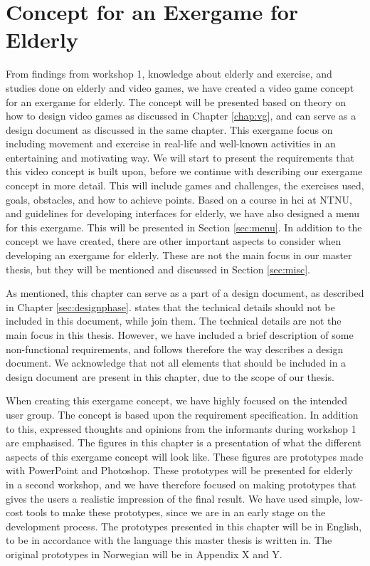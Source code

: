 \chapter{Concept for an Exergame for Elderly}
\label{chap:concept}
From findings from workshop 1, knowledge about elderly and exercise, and studies done on elderly and video games, we have created a video game concept for an exergame for elderly. The concept will be presented based on theory on how to design video games as discussed in Chapter \ref{chap:vg}, and can serve as a design document as discussed in the same chapter. This exergame focus on including movement and exercise in real-life and well-known activities in an entertaining and motivating way. We will start to present the requirements that this video concept is built upon, before we continue with describing our exergame concept in more detail. This will include games and challenges, the exercises used, goals, obstacles, and how to achieve points. Based on a course in \ac{hci} at NTNU, and guidelines for developing interfaces for elderly, we have also designed a menu for this exergame. This will be presented in Section \ref{sec:menu}. In addition to the concept we have created, there are other important aspects to consider when developing an exergame for elderly. These are not the main focus in our master thesis, but they will be mentioned and discussed in Section \ref{sec:misc}.

As mentioned, this chapter can serve as a part of a design document, as described in Chapter \ref{sec:designphase}. \cite{gamedesign} states that the technical details should not be included in this document, while \cite{understandingvg} join them. The technical details are not the main focus in this thesis. However, we have included a brief description of some non-functional requirements, and follows therefore the way \cite{understandingvg} describes a design document. We acknowledge that not all elements that should be included in a design document are present in this chapter, due to the scope of our thesis.

When creating this exergame concept, we have highly focused on the intended user group. The concept is based upon the requirement specification. In addition to this, expressed thoughts and opinions from the informants during workshop 1 are emphasised. The figures in this chapter is a presentation of what the different aspects of this exergame concept will look like. These figures are prototypes made with PowerPoint and Photoshop. These prototypes will be presented for elderly in a second workshop, and we have therefore focused on making prototypes that gives the users a realistic impression of the final result. We have used simple, low-cost tools to make these prototypes, since we are in an early stage on the development process. The prototypes presented in this chapter will be in English, to be in accordance with the language this master thesis is written in. The original prototypes in Norwegian will be in Appendix X and Y. 


